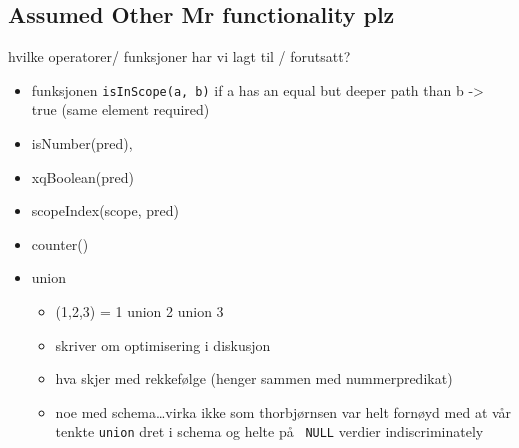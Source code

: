 \subsection{Assumed Other Mr functionality plz}
\label{sect:method:marsAddedOperators}
hvilke operatorer/ funksjoner har vi lagt til / forutsatt?
\begin{itemize}
  	\item funksjonen \verb!isInScope(a, b)! if a has an equal but deeper path than
		b -> true (same element required) 
	\item isNumber(pred), 
	\item xqBoolean(pred)
	\item scopeIndex(scope, pred)
	\item counter()
	\item union
		\begin{itemize}
			  \item (1,2,3) = 1 union 2 union 3 
			  \item skriver om optimisering i diskusjon
			  \item hva skjer med rekkef\o lge (henger sammen med nummerpredikat)
			  \item noe med schema\ldots virka ikke som thorbj\o rnsen var helt forn\o yd
				  med at v\aa r tenkte \texttt{union} dret i schema og helte p\aa~
				  \texttt{NULL} verdier indiscriminately
        \end{itemize}	
\end{itemize}
